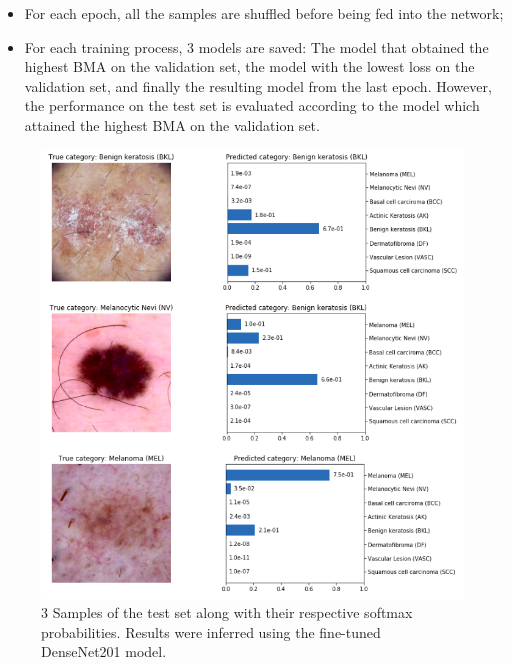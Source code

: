 \begin{itemize}
        \item For each epoch, all the samples are shuffled before being fed into the network;
        \item For each training process, 3 models are saved: The model that obtained the highest \ac{BMA} on the validation set, the model with the lowest loss on the validation set, and finally the resulting model from the last epoch. However, the performance on the test set is evaluated according to the model which attained the highest \ac{BMA} on the validation set. 
    \end{itemize}
    
    \begin{figure}[ht]
        \centering
        \includegraphics[width=\textwidth]{figs/Softmax_probs.png}
        \caption[Three samples of the test set along with their respective softmax probabilities.]{3 Samples of the test set along with their respective softmax probabilities. Results were inferred using the fine-tuned DenseNet201 model.}
        \label{fig:softmax_examples}
    \end{figure}
    
